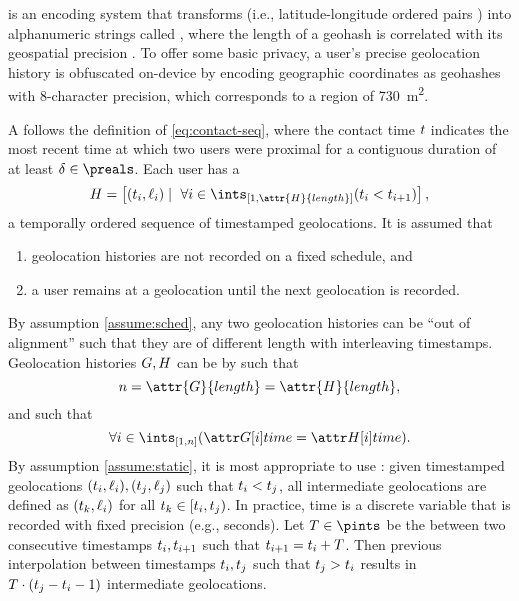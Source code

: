  is an encoding system that transforms  (i.e., latitude-longitude ordered pairs \citep[p. 5]{Sickle2004}) into alphanumeric strings called , where the length of a geohash is correlated with its geospatial precision \citep{Morton1966}. To offer some basic privacy, a user's precise geolocation history is obfuscated on-device by encoding geographic coordinates as geohashes with 8-character precision, which corresponds to a region of \qty{730}{\meter^2}.

A  follows the definition of \cref{eq:contact-seq}, where the contact time $t$ indicates the most recent time at which two users were proximal for a contiguous duration of at least $\delta \in \preals$. Each user has a 
\begin{equation*}
  \htwo = \left[(\vTime_i, \vLocation_i) \mid ~\forall i \in \ints_{[1, \attr{\htwo}{length}]} (\vTime_i < \vTime_{i + 1}) \right],
\end{equation*}
a temporally ordered sequence of timestamped geolocations. It is assumed that
\begin{enumerate}
  \item geolocation histories are not recorded on a fixed schedule, and \label{assume:sched}
  \item a user remains at a geolocation until the next geolocation is recorded. \label{assume:static}
\end{enumerate}
By assumption \ref{assume:sched}, any two geolocation histories can be ``out of alignment'' such that they are of different length with interleaving timestamps. Geolocation histories $G, H$ can be  by  such that
	\begin{equation*}
		n = \attr{\hone}{length} = \attr{\htwo}{length},
	\end{equation*}
and  such that
	\begin{equation*}
		\forall i \in \ints_{[1, n]}(\aTime{\hone[i]} = \aTime{\htwo[i]}).
	\end{equation*}
By assumption \ref{assume:static}, it is most appropriate to use : given timestamped geolocations $(t_i, \ell_i), (t_j, \ell_j)$ such that $t_i < t_j$, all intermediate geolocations are defined as $(t_k, \ell_i)$ for all $t_k \in [t_i, t_j)$. In practice, time is a discrete variable that is recorded with fixed precision (e.g., seconds). Let $T \in \pints$ be the  between two consecutive timestamps $t_i, t_{i + 1}$ such that $t_{i + 1} = t_i + T$. Then previous interpolation between timestamps $t_i, t_j$ such that $t_j > t_i$ results in $T \cdot (t_j - t_i - 1)$ intermediate geolocations.

